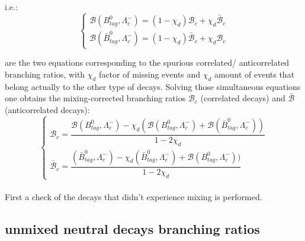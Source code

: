 i.e.:   
\begin{equation}
    \begin{cases}
        \mathcal{B}(B^0_{tag}, \Lambda_c^-) = (1 - \chi_d) \mathcal{B}_c + \chi_d \bar{\mathcal{B}}_c \\

        \mathcal{B}(\bar{B}^0_{tag}, \Lambda_c^-) = (1 - \chi_d) \bar{\mathcal{B}}_c + \chi_d \mathcal{B}_c
    \end{cases}  
\end{equation}

are the two equations corresponding to the spurious correlated/ anticorrelated branching ratios, with  $\chi_d$ factor of missing events
and $\chi_d$ amount of events that belong actually to the other type of decays. Solving those simultaneous equations one obtains the
mixing-corrected branching ratios $\mathcal{B}_c$ (correlated decays) and $\bar{\mathcal{B}}$ (anticorrelated decays): \\

\begin{equation}
    \begin{cases}
        \mathcal{B}_c  = \dfrac{\mathcal{B}(B^0_{tag}, \Lambda_c^-) - \chi_d (\mathcal{B}(B^0_{tag}, \Lambda_c^-) +  \mathcal{B}(\bar{B}^0_{tag}, \Lambda_c^-))}{1 - 2\chi_d}      \\

        \bar{\mathcal{B}}_c = \dfrac{(\bar{B}^0_{tag}, \Lambda_c^-) - \chi_d (\bar{B}^0_{tag}, \Lambda_c^-) +  \mathcal{B}(B^0_{tag}, \Lambda_c^-))}{1 - 2\chi_d}
    \end{cases}  
\end{equation}
\\
First a check of the decays that didn't experience mixing is performed.
\subsection{unmixed neutral decays branching ratios}

